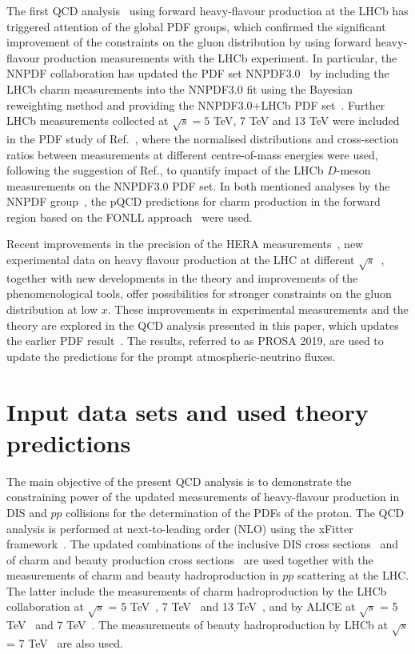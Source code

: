 {\color{blue}The first QCD analysis~\cite{Zenaiev:2015rfa} using forward heavy-flavour production at the LHCb has triggered attention of the global PDF groups, which confirmed the significant improvement of the constraints on the gluon distribution by using forward heavy-flavour production measurements with the LHCb experiment. In particular, the NNPDF collaboration has updated the PDF set NNPDF3.0~\cite{Ball:2014uwa} by including the LHCb charm measurements into the NNPDF3.0 fit using the Bayesian reweighting method and providing the NNPDF3.0+LHCb PDF set~\cite{Gauld:2015yia}. Further LHCb measurements collected at $\sqrt{s}=5$ TeV, 7 TeV and 13 TeV were included in the PDF study of Ref.~\cite{Gauld:2016kpd}, where the normalised distributions and cross-section ratios between measurements at different centre-of-mass energies were used, following the suggestion of Ref.\cite{Cacciari:2015fta}, to quantify impact of the LHCb $D$-meson measurements on the NNPDF3.0 PDF set. In both mentioned analyses by the NNPDF group~\cite{Gauld:2015yia,Gauld:2016kpd}, the pQCD predictions for charm production in the forward region based on the FONLL approach~\cite{Cacciari:1993mq} were used.}


Recent improvements in the precision of the HERA measurements~\cite{Abramowicz:2015mha,H1:2018flt}, new experimental data on heavy flavour production at the LHC at 
different $\sqrt{s}$~\cite{Aaij:2015bpa,Aaij:2016jht,Acharya:2017jgo,Acharya:2019mgn}, together with new developments in the theory and improvements of the phenomenological tools, offer 
possibilities for stronger constraints on the gluon distribution at low $x$. These improvements in experimental measurements 
and the theory are explored in the QCD analysis presented in this paper, which updates the earlier PDF result~\cite{Zenaiev:2015rfa}. The results, referred to as PROSA 2019, are used to update the predictions for the prompt atmospheric-neutrino fluxes. 


\section{Input data sets and used theory predictions}
\label{sec:qcdanalysis}

The main objective of the present QCD analysis is to demonstrate the constraining power of the updated measurements of 
heavy-flavour production in DIS and $pp$ collisions for the determination of the PDFs of the proton. 
The QCD analysis is performed at next-to-leading order (NLO) using the xFitter framework~\cite{Alekhin:2014irh}. 
The updated combinations of the inclusive DIS cross sections~\cite{Abramowicz:2015mha} and of charm and beauty production cross sections~\cite{H1:2018flt} are used together with the measurements of charm and beauty hadroproduction in $pp$ scattering at the LHC. The latter include the measurements of charm hadroproduction by the LHCb collaboration at $\sqrt{s}$ = 5 TeV~\cite{Aaij:2016jht}, 7 TeV~\cite{Aaij:2013mga} and 13 TeV~\cite{Aaij:2015bpa}, and by ALICE at $\sqrt{s}$ = 5 TeV~\cite{Acharya:2019mgn} and 7 TeV~\cite{Acharya:2017jgo}. The measurements of beauty hadroproduction by LHCb at $\sqrt{s}$ = 7 TeV~\cite{Aaij:2013noa} are also used.

